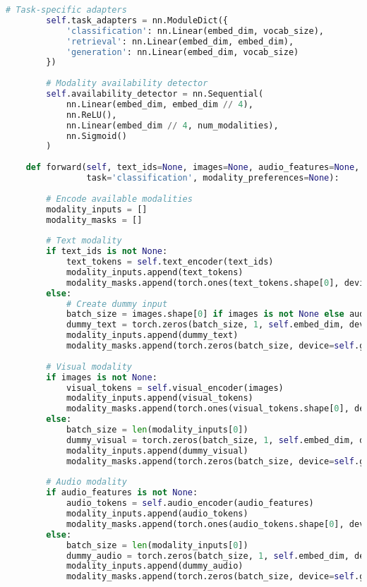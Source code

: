 \begin{lstlisting}[language=Python, caption=Dynamic modality switching architecture]
        # Task-specific adapters
        self.task_adapters = nn.ModuleDict({
            'classification': nn.Linear(embed_dim, vocab_size),
            'retrieval': nn.Linear(embed_dim, embed_dim),
            'generation': nn.Linear(embed_dim, vocab_size)
        })
        
        # Modality availability detector
        self.availability_detector = nn.Sequential(
            nn.Linear(embed_dim, embed_dim // 4),
            nn.ReLU(),
            nn.Linear(embed_dim // 4, num_modalities),
            nn.Sigmoid()
        )
    
    def forward(self, text_ids=None, images=None, audio_features=None, 
                task='classification', modality_preferences=None):
        
        # Encode available modalities
        modality_inputs = []
        modality_masks = []
        
        # Text modality
        if text_ids is not None:
            text_tokens = self.text_encoder(text_ids)
            modality_inputs.append(text_tokens)
            modality_masks.append(torch.ones(text_tokens.shape[0], device=text_tokens.device))
        else:
            # Create dummy input
            batch_size = images.shape[0] if images is not None else audio_features.shape[0]
            dummy_text = torch.zeros(batch_size, 1, self.embed_dim, device=self.get_device())
            modality_inputs.append(dummy_text)
            modality_masks.append(torch.zeros(batch_size, device=self.get_device()))
        
        # Visual modality
        if images is not None:
            visual_tokens = self.visual_encoder(images)
            modality_inputs.append(visual_tokens)
            modality_masks.append(torch.ones(visual_tokens.shape[0], device=visual_tokens.device))
        else:
            batch_size = len(modality_inputs[0])
            dummy_visual = torch.zeros(batch_size, 1, self.embed_dim, device=self.get_device())
            modality_inputs.append(dummy_visual)
            modality_masks.append(torch.zeros(batch_size, device=self.get_device()))
        
        # Audio modality
        if audio_features is not None:
            audio_tokens = self.audio_encoder(audio_features)
            modality_inputs.append(audio_tokens)
            modality_masks.append(torch.ones(audio_tokens.shape[0], device=audio_tokens.device))
        else:
            batch_size = len(modality_inputs[0])
            dummy_audio = torch.zeros(batch_size, 1, self.embed_dim, device=self.get_device())
            modality_inputs.append(dummy_audio)
            modality_masks.append(torch.zeros(batch_size, device=self.get_device()))
        

\end{lstlisting}

